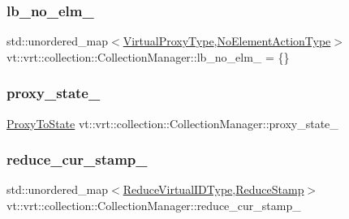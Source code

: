 \subsubsection{\texorpdfstring{lb\+\_\+no\+\_\+elm\+\_\+}{lb\_no\_elm\_}}
{\footnotesize\ttfamily std\+::unordered\+\_\+map$<$\hyperlink{namespacevt_a1b417dd5d684f045bb58a0ede70045ac}{Virtual\+Proxy\+Type},\hyperlink{structvt_1_1vrt_1_1collection_1_1_collection_manager_a6b9b76aadc721cec45d3e0e02d849ff1}{No\+Element\+Action\+Type}$>$ vt\+::vrt\+::collection\+::\+Collection\+Manager\+::lb\+\_\+no\+\_\+elm\+\_\+ = \{\}\hspace{0.3cm}{\ttfamily [private]}}

\mbox{\label{structvt_1_1vrt_1_1collection_1_1_collection_manager_a5bafa0103098ee13e3b3653431e2657d}} 
\subsubsection{\texorpdfstring{proxy\+\_\+state\+\_\+}{proxy\_state\_}}
{\footnotesize\ttfamily \hyperlink{structvt_1_1vrt_1_1collection_1_1_collection_manager_a47acf9cd5a988ba197fbef5097f75dde}{Proxy\+To\+State} vt\+::vrt\+::collection\+::\+Collection\+Manager\+::proxy\+\_\+state\+\_\+\hspace{0.3cm}{\ttfamily [private]}}

\mbox{\label{structvt_1_1vrt_1_1collection_1_1_collection_manager_a5bf3bcab36addad323a03746928dfac8}} 
\subsubsection{\texorpdfstring{reduce\+\_\+cur\+\_\+stamp\+\_\+}{reduce\_cur\_stamp\_}}
{\footnotesize\ttfamily std\+::unordered\+\_\+map$<$\hyperlink{structvt_1_1vrt_1_1collection_1_1_collection_manager_ae820c8c22ae8c7350fa0232e0749b097}{Reduce\+Virtual\+I\+D\+Type},\hyperlink{structvt_1_1vrt_1_1collection_1_1_collection_manager_ae8aac19e0ae07e9225142e5880eac830}{Reduce\+Stamp}$>$ vt\+::vrt\+::collection\+::\+Collection\+Manager\+::reduce\+\_\+cur\+\_\+stamp\+\_\+\hspace{0.3cm}{\ttfamily [private]}}

